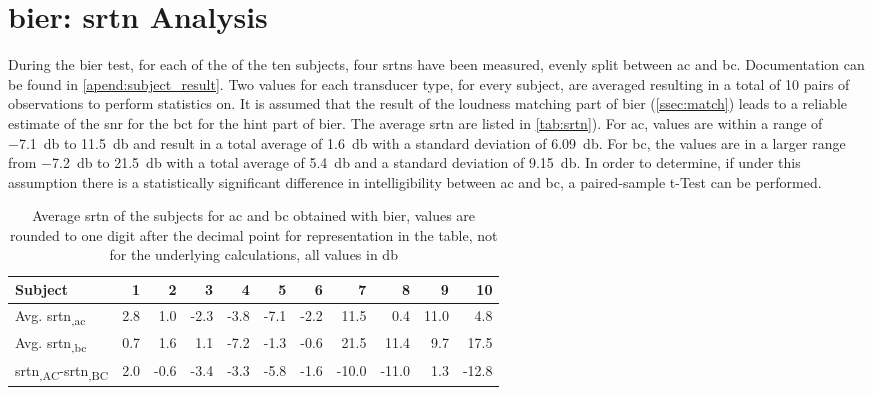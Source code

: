 \section{\gls{bier}: \gls{srtn} Analysis}\label{sec:result_srt}


During the \gls{bier} test, for each of the of the ten subjects, four \gls{srtn}s have been measured, evenly split between \gls{ac} and \gls{bc}. Documentation can be found in \autoref{apend:subject_result}.
Two values for each transducer type, for every subject, are averaged resulting in a total of 10 pairs of observations to perform statistics on.
It is assumed that the result of the loudness matching part of \gls{bier} (\autoref{ssec:match}) leads to a reliable estimate of the \gls{snr} for the \gls{bct} for the \gls{hint} part of \gls{bier}.
The average \gls{srtn} are listed in \autoref{tab:srtn}). For \gls{ac}, values are within a range of \SI{-7.1}{\decibel} to \SI{11.5}{\decibel} and result in a total average of \SI{1.6}{\decibel} with a standard deviation of \SI{6.09}{\decibel}. For \gls{bc}, the values are in a larger range from \SI{-7.2}{\decibel} to  \SI{21.5}{\decibel} with a total average of \SI{5.4}{\decibel} and a standard deviation of \SI{9.15}{\decibel}.
In order to determine, if under this assumption there is a statistically significant difference in intelligibility between \gls{ac} and \gls{bc}, a paired-sample t-Test can be performed.\\

\begin{table}[H]
\centering
\caption{Average \gls{srtn} of the subjects for \gls{ac} and \gls{bc} obtained with \gls{bier}, values are rounded to one digit after the decimal point for representation in the table, not for the underlying calculations, all values in \si{\decibel}}
\label{tab:srtn}
\begin{tabular}{l|rrrrrrrrrr}
Subject     & 1   & 2    & 3    & 4    & 5    & 6    & 7     & 8     & 9    & 10   \\ \hline
Avg. \gls{srtn}\textsubscript{,\gls{ac}} & 2.8 & 1.0  & -2.3 & -3.8 & -7.1 & -2.2 & 11.5  & 0.4   & 11.0 & 4.8  \\
Avg. \gls{srtn}\textsubscript{,\gls{bc}} & 0.7 & 1.6  & 1.1  & -7.2 & -1.3 & -0.6 & 21.5  & 11.4  & 9.7  & 17.5 \\
\gls{srtn}\textsubscript{,AC}-\gls{srtn}\textsubscript{,BC}  & 2.0 & -0.6 & -3.4 & -3.3 & -5.8 & -1.6 & -10.0 & -11.0 & 1.3  & -12.8
\end{tabular}
\end{table}

